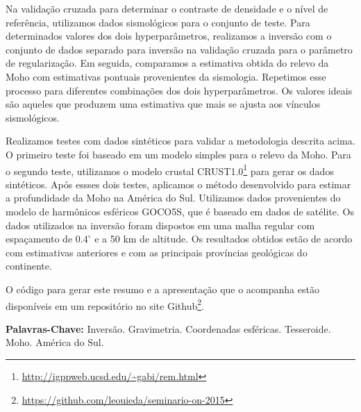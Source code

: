 \documentclass[12pt]{letter}
\begin{document}
Na validação cruzada para determinar o contraste de densidade e o nível de
referência, utilizamos dados sismológicos para o conjunto de teste.
Para determinados valores dos dois hyperparâmetros, realizamos a inversão com o
conjunto de dados separado para inversão na validação cruzada para o parâmetro
de regularização.
Em seguida, comparamos a estimativa obtida do relevo da Moho com estimativas
pontuais provenientes da sismologia.
Repetimos esse processo para diferentes combinações dos dois hyperparâmetros.
Os valores ideais são aqueles que produzem uma estimativa que mais se ajusta
aos vínculos sismológicos.

Realizamos testes com dados sintéticos para validar a metodologia descrita
acima.
O primeiro teste foi baseado em um modelo simples para o relevo da Moho.
Para o segundo teste, utilizamos o modelo crustal
CRUST1.0\footnote{\url{http://igppweb.ucsd.edu/~gabi/rem.html}}
para gerar os dados sintéticos.
Após essses dois testes, aplicamos o método desenvolvido para estimar a
profundidade da Moho na América do Sul.
Utilizamos dados provenientes do modelo de harmônicos esféricos GOCO5S, que é
baseado em dados de satélite.
Os dados utilizados na inversão foram dispostos em uma malha regular com
espaçamento de $0.4^\circ$ e a 50 km de altitude.
Os resultados obtidos estão de acordo com estimativas anteriores e com as
principais províncias geológicas do continente.

O código para gerar este resumo
e a apresentação que o acompanha
estão disponíveis em um repositório no site
Github\footnote{\url{https://github.com/leouieda/seminario-on-2015}}.

\textbf{Palavras-Chave:}
Inversão. Gravimetria. Coordenadas esféricas. Tesseroide. Moho. América do Sul.
\end{document}
